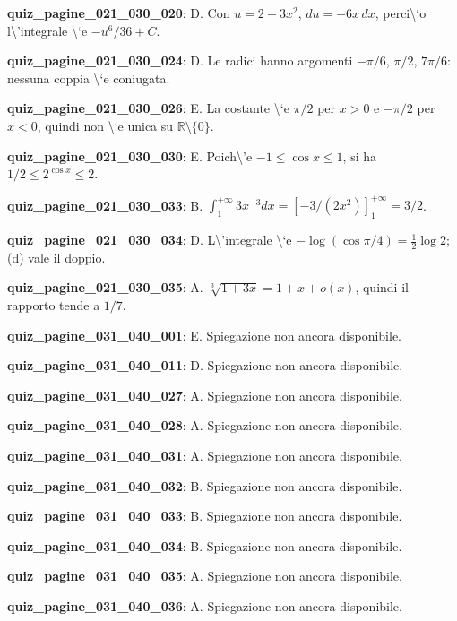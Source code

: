 \documentclass[11pt,a4paper]{article}
\newcounter{quiz}
\begin{document}
\noindent\textbf{quiz\_pagine\_021\_030\_020}: D. Con $u=2-3x^2$, $du=-6x\,dx$, perci\textbackslash{}`o l\textbackslash{}'integrale \textbackslash{}`e $-u^6/36+C$.\par\medskip
\noindent\textbf{quiz\_pagine\_021\_030\_024}: D. Le radici hanno argomenti $-\pi/6$, $\pi/2$, $7\pi/6$: nessuna coppia \textbackslash{}`e coniugata.\par\medskip
\noindent\textbf{quiz\_pagine\_021\_030\_026}: E. La costante \textbackslash{}`e $\pi/2$ per $x>0$ e $-\pi/2$ per $x<0$, quindi non \textbackslash{}`e unica su $\mathbb R\setminus\{0\}$.\par\medskip
\noindent\textbf{quiz\_pagine\_021\_030\_030}: E. Poich\textbackslash{}'e $-1\le\cos x\le1$, si ha $1/2\le2^{\cos x}\le2$.\par\medskip
\noindent\textbf{quiz\_pagine\_021\_030\_033}: B. $\int_1^{+\infty}3x^{-3}dx=[-3/(2x^2)]_1^{+\infty}=3/2$.\par\medskip
\noindent\textbf{quiz\_pagine\_021\_030\_034}: D. L\textbackslash{}'integrale \textbackslash{}`e $-\log(\cos\pi/4)=\frac12\log2$; (d) vale il doppio.\par\medskip
\noindent\textbf{quiz\_pagine\_021\_030\_035}: A. $\sqrt[3]{1+3x}=1+x+o(x)$, quindi il rapporto tende a $1/7$.\par\medskip
\noindent\textbf{quiz\_pagine\_031\_040\_001}: E. Spiegazione non ancora disponibile.\par\medskip
\noindent\textbf{quiz\_pagine\_031\_040\_011}: D. Spiegazione non ancora disponibile.\par\medskip
\noindent\textbf{quiz\_pagine\_031\_040\_027}: A. Spiegazione non ancora disponibile.\par\medskip
\noindent\textbf{quiz\_pagine\_031\_040\_028}: A. Spiegazione non ancora disponibile.\par\medskip
\noindent\textbf{quiz\_pagine\_031\_040\_031}: A. Spiegazione non ancora disponibile.\par\medskip
\noindent\textbf{quiz\_pagine\_031\_040\_032}: B. Spiegazione non ancora disponibile.\par\medskip
\noindent\textbf{quiz\_pagine\_031\_040\_033}: B. Spiegazione non ancora disponibile.\par\medskip
\noindent\textbf{quiz\_pagine\_031\_040\_034}: B. Spiegazione non ancora disponibile.\par\medskip
\noindent\textbf{quiz\_pagine\_031\_040\_035}: A. Spiegazione non ancora disponibile.\par\medskip
\noindent\textbf{quiz\_pagine\_031\_040\_036}: A. Spiegazione non ancora disponibile.\par\medskip
\end{document}

